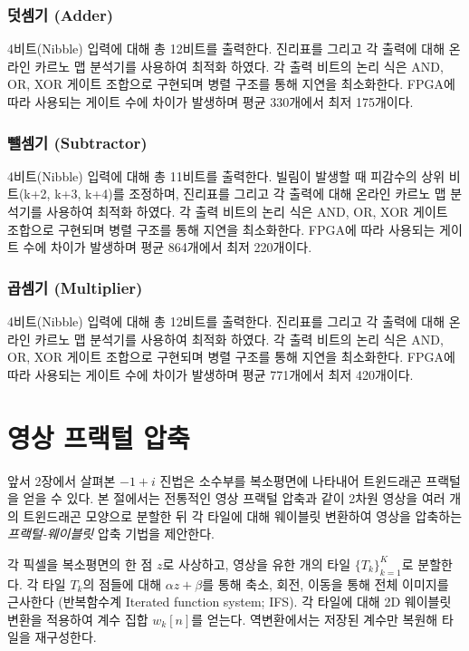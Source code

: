 \documentclass[10pt,a4paper,notitlepage]{report}
\begin{document}
\begin{multicols*}{2}
\subsubsection{덧셈기 (Adder)\cite{Jamil2019}}
4비트(Nibble) 입력에 대해 총 12비트를 출력한다. 진리표를 그리고 각 출력에 대해 온라인 카르노 맵 분석기를 사용하여 최적화 하였다. 각 출력 비트의 논리 식은 AND, OR, XOR 게이트 조합으로 구현되며 병렬 구조를 통해 지연을 최소화한다. FPGA에 따라 사용되는 게이트 수에 차이가 발생하며 평균 330개에서 최저 175개이다.

\subsubsection{뺄셈기 (Subtractor)\cite{Jamil2021Subtractor}}
4비트(Nibble) 입력에 대해 총 11비트를 출력한다. 빌림이 발생할 때 피감수의 상위 비트(k+2, k+3, k+4)를 조정하며, 진리표를 그리고 각 출력에 대해 온라인 카르노 맵 분석기를 사용하여 최적화 하였다. 각 출력 비트의 논리 식은 AND, OR, XOR 게이트 조합으로 구현되며 병렬 구조를 통해 지연을 최소화한다. FPGA에 따라 사용되는 게이트 수에 차이가 발생하며 평균 864개에서 최저 220개이다.

\subsubsection{곱셈기 (Multiplier)\cite{Jamil2021Multiplier}}
4비트(Nibble) 입력에 대해 총 12비트를 출력한다. 진리표를 그리고 각 출력에 대해 온라인 카르노 맵 분석기를 사용하여 최적화 하였다. 각 출력 비트의 논리 식은 AND, OR, XOR 게이트 조합으로 구현되며 병렬 구조를 통해 지연을 최소화한다. FPGA에 따라 사용되는 게이트 수에 차이가 발생하며 평균 771개에서 최저 420개이다.

\section{영상 프랙털 압축}
앞서 2장에서 살펴본 $-1+i$ 진법은 소수부를 복소평면에 나타내어 트윈드래곤 프랙털을 얻을 수 있다. 본 절에서는 전통적인 영상 프랙털 압축과 같이 2차원 영상을 여러 개의 트윈드래곤 모양으로 분할한 뒤 각 타일에 대해 웨이블릿 변환하여 영상을 압축하는 \emph{프랙털-웨이블릿} 압축 기법을 제안한다.

각 픽셀을 복소평면의 한 점 $z$로 사상하고, 영상을 유한 개의 타일 $\{T_k\}_{k=1}^K$로 분할한다. 각 타일 $T_k$의 점들에 대해 $\alpha z +\beta$를 통해 축소, 회전, 이동을 통해 전체 이미지를 근사한다 (반복함수계 Iterated function system; IFS). 각 타일에 대해 2D 웨이블릿 변환을 적용하여 계수 집합 $w_{k}[n]$를 얻는다. 역변환에서는 저장된 계수만 복원해 타일을 재구성한다.


\end{multicols*}
\end{document}
